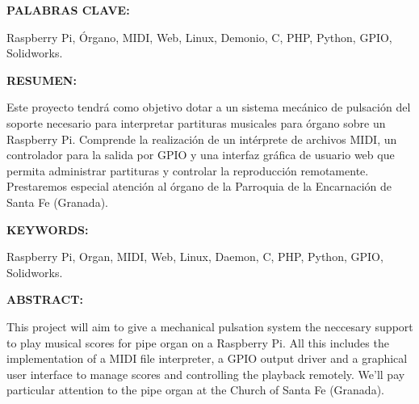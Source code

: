 \begin{doublespace}
\noindent \textbf{PALABRAS CLAVE:}
\end{doublespace}



\begin{singlespace}
\noindent Raspberry Pi, Órgano, MIDI, Web, Linux, Demonio, C, PHP, Python, GPIO, Solidworks.

\end{singlespace}

\begin{doublespace}
\noindent \textbf{RESUMEN:}
\end{doublespace}

\begin{singlespace}

\noindent Este proyecto tendrá como objetivo dotar a un sistema mecánico de pulsación del soporte necesario para interpretar partituras musicales para órgano sobre un Raspberry Pi. Comprende la realización de un intérprete de archivos MIDI, un controlador para la salida por GPIO y una interfaz gráfica de usuario web que permita administrar partituras y controlar la reproducción remotamente. Prestaremos especial atención al órgano de la Parroquia de la Encarnación de Santa Fe (Granada).
\end{singlespace}

\vspace{1.25cm}

\begin{doublespace}
\noindent \textbf{KEYWORDS:}
\end{doublespace}

\begin{singlespace}
\noindent Raspberry Pi, Organ, MIDI, Web, Linux, Daemon, C, PHP, Python, GPIO, Solidworks.
\end{singlespace}

\begin{doublespace}
\noindent \textbf{ABSTRACT:}
\end{doublespace}

\begin{singlespace}
\noindent This project will aim to give a mechanical pulsation system the neccesary support to play musical scores for pipe organ on a Raspberry Pi. All this includes the implementation of a MIDI file interpreter, a GPIO output driver and a graphical user interface to manage scores and controlling the playback remotely. We'll pay particular attention to the pipe organ at the Church of Santa Fe (Granada).
\end{singlespace}

